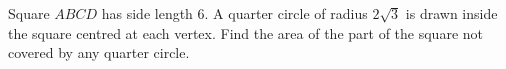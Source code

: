 Square $ABCD$ has side length $6$. A quarter circle of radius $2\sqrt3$ is drawn inside the square centred at each vertex. Find the area of the part of the square not covered by any quarter circle.
